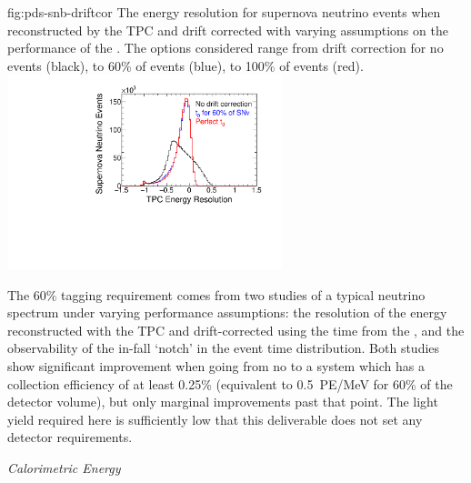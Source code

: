 \begin{dunefigure}
{fig:pds-snb-driftcor}
{The energy resolution for supernova neutrino events when reconstructed by the TPC and drift corrected with varying assumptions on the performance of the . The options considered range from drift correction for no events (black), to 60\% of events (blue), to 100\% of events (red).
}
  \includegraphics[width=0.6\textwidth]{graphics/pds-snb-drift-corr}
 \end{dunefigure}

The 60\% \tzero tagging requirement comes from two studies of a typical  neutrino spectrum under varying  performance assumptions: the resolution of the energy reconstructed with the TPC and drift-corrected using the time from the , and the observability of the in-fall `notch' in the  event time distribution. Both studies show significant improvement when going from no  to a system which has a collection efficiency of at least 0.25\% (equivalent to \SI{0.5}{PE/MeV} for 60\% of the detector volume), but only marginal improvements past that point. The light yield required here is sufficiently low that this deliverable does not set any detector requirements.


\textit{Calorimetric Energy}

